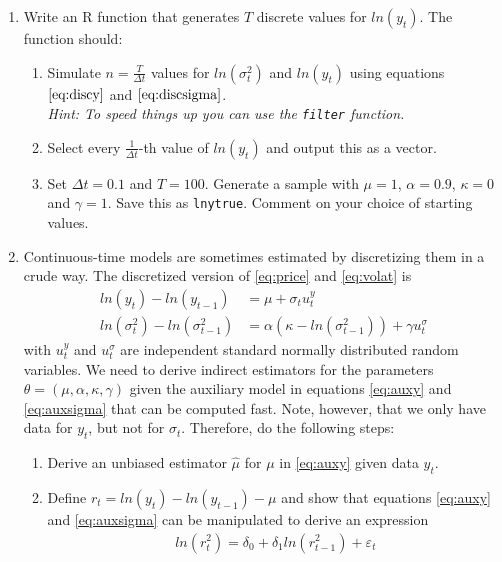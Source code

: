 \documentclass{article}
\begin{document}
\begin{enumerate}[resume,label=(\alph*)]
\item Write an R function that generates $T$ discrete values for $ln(y_t)$. The function should:
    \begin{enumerate}[label=(\roman*)]
    \item Simulate $n=\frac{T}{\Delta t}$ values for $ln(\sigma_t^2)$ and $ln(y_t)$ using equations $\eqref{eq:discy}$ and $\eqref{eq:discsigma}$.\\
        \emph{Hint: To speed things up you can use the \texttt{filter} function.}
    \item Select every $\frac{1}{\Delta t}$-th value of $ln(y_t)$ and output this as a vector.
    \item Set $\Delta t=0.1$ and $T=100$. Generate a sample with $\mu=1$, $\alpha=0.9$, $\kappa=0$ and $\gamma=1$. Save this as \texttt{lnytrue}. Comment on your choice of starting values.
    \end{enumerate}
\newpage
\item Continuous-time models are sometimes estimated by discretizing them in a crude way. The discretized version of \eqref{eq:price} and \eqref{eq:volat} is
    \begin{align}
        ln(y_t) - ln(y_{t-1}) &= \mu + \sigma_t u_t^y\label{eq:auxy}\\
        ln(\sigma_t^2) - ln(\sigma_{t-1}^2) &= \alpha(\kappa-ln(\sigma_{t-1}^2)) + \gamma u_t^\sigma\label{eq:auxsigma}
    \end{align}
    with $u_t^y$ and $u_t^\sigma$ are independent standard normally distributed random variables.    We need to derive indirect estimators for the parameters $\theta=(\mu,\alpha,\kappa,\gamma)$ given the auxiliary model in equations \eqref{eq:auxy} and \eqref{eq:auxsigma} that can be computed fast. Note, however, that we only have data for $y_t$, but not for $\sigma_t$. Therefore, do the following steps:
    \begin{enumerate}[label=(\roman*)]
      \item Derive an unbiased estimator $\hat{\mu}$ for $\mu$ in \eqref{eq:auxy} given data $y_t$.
      \item Define $r_t=ln(y_t)-ln(y_{t-1})-\mu$ and show that equations \eqref{eq:auxy} and \eqref{eq:auxsigma} can be manipulated to derive an expression
      \begin{align}
      ln(r_t^2)= \delta_0 + \delta_1 ln(r_{t-1}^2) + \varepsilon_t \label{eq:r}
    \end{align}

\end{enumerate}
\end{enumerate}
\end{document}
